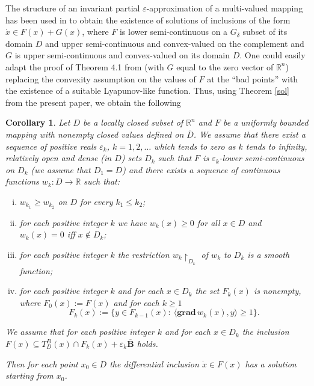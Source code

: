 \documentclass[a4paper]{article}
\newtheorem{corol}[thm]{Corollary}
\begin{document}
The structure of an invariant partial $\varepsilon$-approximation of a multi-valued mapping has been used in \cite{KR} to obtain the existence of solutions of inclusions of the form $\dot{x} \in F(x)+G(x)$, where $F$ is lower semi-continuous on a $G_{\delta}$ subset of its domain $D$ and upper semi-continuous and convex-valued on the complement and $G$ is upper semi-continuous and convex-valued on its domain $D$.  One could easily adapt the proof of Theorem 4.1 from \cite{KR} (with ${G}$ equal to the zero vector of $\mathbb{R}^{n}$) replacing the convexity assumption
on the values of $F$ at the ``bad points'' with the existence of a suitable Lyapunov-like function. Thus, using Theorem \ref{sol} from the present paper, we obtain the following

\begin{corol}\label{mixed}
    Let $D$ be a locally closed subset of $\mathbb{R}^n$ and $F$ be a uniformly bounded mapping with nonempty closed values defined on $\overline{D}$. We assume that there exist a sequence of positive reals $\varepsilon_k$, $k=1,2,\dots$ which tends to zero as $k$ tends to infinity,  relatively open and dense (in $D$) sets $D_k$ such that $F$ is $\varepsilon_k$-lower semi-continuous on $D_k$ (we assume that $D_1 = D$) and there exists a sequence of continuous functions $w_k :  {D} \to \mathbb{R}$ such that:
     \begin{enumerate}[(i)]
           \item $w_{k_1} \ge w_{k_2}$ on $ {D}$ for every $k_1 \le k_2$;
           \item for each positive integer $k$ we have $w_k(x) \ge 0$ for all $x \in D$ and $w_k(x) = 0$ iff $x \notin D_k$;
           \item for each positive integer $k$ the restriction $w_k\!\restriction_{D_k}$ of $w_k$ to $D_k$ is a smooth function;
          \item for each positive integer $k$ and for each $x \in D_k$ the set $F_k (x) $ is nonempty, where $F_0 (x):=F(x)$ and
          for each $k\ge 1$
          $$F_k(x):= \{y \in F_{k-1}(x):\    \langle \mathbf{grad} \, w_k(x) , y \rangle \ge 1\}.$$
     \end{enumerate}
    We assume that for each positive integer $k$ and for each $x \in D_k$ the inclusion $F(x) \subseteq T^B_{D}(x)\cap F_k(x) + \varepsilon_k \overline{\textbf{B}}$ holds.

    Then for each point $x_0 \in  D$ the differential inclusion $\dot{x} \in F(x)$ has a solution starting from $x_0$.
\end{corol}
\end{document}
